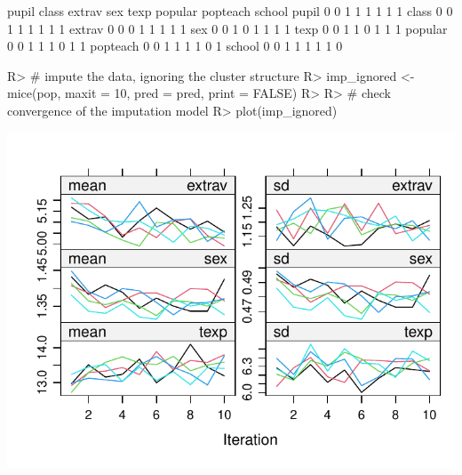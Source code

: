 \documentclass[
]{jss}
\begin{document}
\begin{CodeChunk}
\begin{CodeOutput}
         pupil class extrav sex texp popular popteach school
pupil        0     0      1   1    1       1        1      1
class        0     0      1   1    1       1        1      1
extrav       0     0      0   1    1       1        1      1
sex          0     0      1   0    1       1        1      1
texp         0     0      1   1    0       1        1      1
popular      0     0      1   1    1       0        1      1
popteach     0     0      1   1    1       1        0      1
school       0     0      1   1    1       1        1      0
\end{CodeOutput}
\begin{CodeInput}
R> # impute the data, ignoring the cluster structure
R> imp_ignored <- mice(pop, maxit = 10, pred = pred, print = FALSE)
R> 
R> # check convergence of the imputation model
R> plot(imp_ignored)
\end{CodeInput}


\begin{center}\includegraphics{Manuscript_files/figure-latex/pop-ignored-1} \end{center}




\end{CodeChunk}
\end{document}
